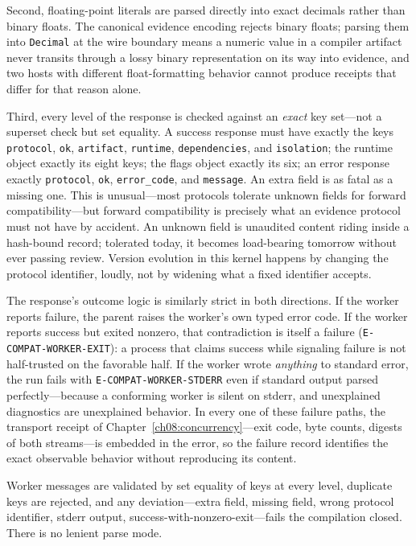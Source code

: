 Second, floating-point literals are parsed directly into exact decimals rather than binary floats. The canonical evidence encoding rejects binary floats; parsing them into \texttt{Decimal} at the wire boundary means a numeric value in a compiler artifact never transits through a lossy binary representation on its way into evidence, and two hosts with different float-formatting behavior cannot produce receipts that differ for that reason alone.

Third, every level of the response is checked against an \emph{exact} key set---not a superset check but set equality. A success response must have exactly the keys \texttt{protocol}, \texttt{ok}, \texttt{artifact}, \texttt{runtime}, \texttt{dependencies}, and \texttt{isolation}; the runtime object exactly its eight keys; the flags object exactly its six; an error response exactly \texttt{protocol}, \texttt{ok}, \texttt{error\_code}, and \texttt{message}. An extra field is as fatal as a missing one. This is unusual---most protocols tolerate unknown fields for forward compatibility---but forward compatibility is precisely what an evidence protocol must not have by accident. An unknown field is unaudited content riding inside a hash-bound record; tolerated today, it becomes load-bearing tomorrow without ever passing review. Version evolution in this kernel happens by changing the protocol identifier, loudly, not by widening what a fixed identifier accepts.

The response's outcome logic is similarly strict in both directions. If the worker reports failure, the parent raises the worker's own typed error code. If the worker reports success but exited nonzero, that contradiction is itself a failure (\texttt{E-COMPAT-WORKER-EXIT}): a process that claims success while signaling failure is not half-trusted on the favorable half. If the worker wrote \emph{anything} to standard error, the run fails with \texttt{E-COMPAT-WORKER-STDERR} even if standard output parsed perfectly---because a conforming worker is silent on stderr, and unexplained diagnostics are unexplained behavior. In every one of these failure paths, the transport receipt of Chapter~\ref{ch08:concurrency}---exit code, byte counts, digests of both streams---is embedded in the error, so the failure record identifies the exact observable behavior without reproducing its content.

\begin{ruleenv}\label{ch07:rule:exact-shapes}
Worker messages are validated by set equality of keys at every level, duplicate keys are rejected, and any deviation---extra field, missing field, wrong protocol identifier, stderr output, success-with-nonzero-exit---fails the compilation closed. There is no lenient parse mode.
\end{ruleenv}


